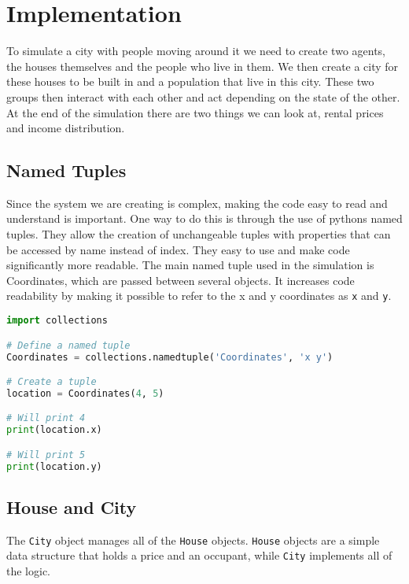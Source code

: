 \section{Implementation}

\par
To simulate a city with people moving around it we need to create two agents, the houses themselves and the people who live in them. We then create a city for these houses to be built in and a population that live in this city. These two groups then interact with each other and act depending on the state of the other. At the end of the simulation there are two things we can look at, rental prices and income distribution.

\subsection{Named Tuples}

Since the system we are creating is complex, making the code easy to read and understand is important. One way to do this is through the use of pythons named tuples. They allow the creation of unchangeable tuples with properties that can be accessed by name instead of index. They easy to use and make code significantly more readable. The main named tuple used in the simulation is Coordinates, which are passed between several objects. It increases code readability by making it possible to refer to the x and y coordinates as \texttt{x} and \texttt{y}.
\\

\begin{lstlisting}[language=Python]
import collections

# Define a named tuple
Coordinates = collections.namedtuple('Coordinates', 'x y')

# Create a tuple
location = Coordinates(4, 5)

# Will print 4
print(location.x)

# Will print 5
print(location.y)
\end{lstlisting}

\subsection{House and City}

\par
The \texttt{City} object manages all of the \texttt{House} objects. \texttt{House} objects are a simple data structure that holds a price and an occupant, while \texttt{City} implements all of the logic.

